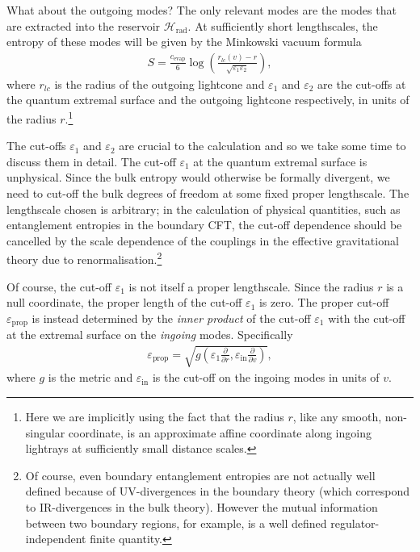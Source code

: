 \documentclass[11pt,a4paper]{article}
\begin{document}
What about the outgoing modes? The only relevant modes are the modes that are extracted into the reservoir $\mathcal{H}_\text{rad}$. At sufficiently short lengthscales, the entropy of these modes will be given by the Minkowski vacuum formula \cite{calabrese2004entanglement, calabrese2009entanglement}
\begin{align} \label{eq:bulkentropyoutgoing}
S = \frac{c_\text{evap}}{6}\log\left(\frac{r_{lc}(v) - r}{\sqrt{\varepsilon_1 \varepsilon_2}}\right),
\end{align}
where $r_{lc}$ is the radius of the outgoing lightcone and $\varepsilon_1$ and $\varepsilon_2$ are the cut-offs at the quantum extremal surface and the outgoing lightcone respectively, in units of the radius $r$.\footnote{Here we are implicitly using the fact that the radius $r$, like any smooth, non-singular coordinate, is an approximate affine coordinate along ingoing lightrays at sufficiently small distance scales.}

The cut-offs $\varepsilon_1$ and $\varepsilon_2$ are crucial to the calculation and so we take some time to discuss them in detail. The cut-off $\varepsilon_1$ at the quantum extremal surface is unphysical. Since the bulk entropy would otherwise be formally divergent, we need to cut-off the bulk degrees of freedom at some fixed proper lengthscale. The lengthscale chosen is arbitrary; in the calculation of physical quantities, such as entanglement entropies in the boundary CFT, the cut-off dependence should be cancelled by the scale dependence of the couplings in the effective gravitational theory due to renormalisation.\footnote{Of course, even boundary entanglement entropies are not actually well defined because of UV-divergences in the boundary theory (which correspond to IR-divergences in the bulk theory). However the mutual information between two boundary regions, for example, is a well defined regulator-independent finite quantity.}

Of course, the cut-off $\varepsilon_1$ is not itself a proper lengthscale. Since the radius $r$ is a null coordinate, the proper length of the cut-off $\varepsilon_1$ is zero. The proper cut-off $\varepsilon_\text{prop}$ is instead determined by the \emph{inner product} of the cut-off $\varepsilon_1$ with the cut-off at the extremal surface on the \emph{ingoing} modes. Specifically
\begin{align}
\varepsilon_\text{prop} = \sqrt{g\left(\varepsilon_1 \frac{\partial}{\partial r}, \varepsilon_\text{in} \frac{\partial}{\partial v}\right)},
\end{align}
where $g$ is the metric and $\varepsilon_\text{in}$ is the cut-off on the ingoing modes in units of $v$.
\end{document}
